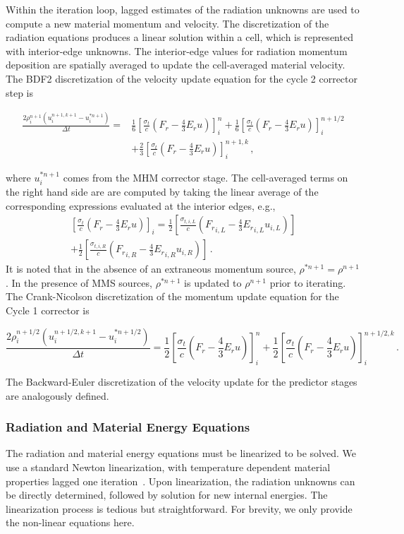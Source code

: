 \documentclass[preprint,12pt]{elsarticle}
\newcommand{\pec}{\, ,}
\newcommand{\pep}{\, .}
\newcommand{\lequ}[1]{\label{eq:#1}}
\newcommand{\half}{\frac{1}{2}}
\newcommand{\sixth}{\frac{1}{6}}
\newcommand{\E}{{E_r}}
\newcommand{\F}{{F_r}}
\newcommand{\dt}{\Delta t}
\newcommand{\iL}{_{i,L}}
\newcommand{\iR}{_{i,R}}
\newcommand{\momentumSource}{
   \left[\frac{\sigma_{t}}{c}\left(\F-\frac{4}{3}\E u\right)\right]
}
\newcommand{\momentumUpdateCN}[5]{
\begin{equation}
    \frac{#2\rho^{#4}#3\left(u^{#4,k+1}#3-u^{*#4}#3\right)}{\dt} = 
   \half\momentumSource^{#1}#3
   +\half\momentumSource^{#4,k}#3
  \pep
#5
\end{equation}
}
\newcommand{\momentumUpdateBDFTwo}[6]{
\begin{equation}\begin{split}
    \frac{#3\rho^{#5}#4\left(u^{#5,k+1}#4-u^{*#5}#4\right)}{\dt} =  
  & \sixth\momentumSource^{#1}#4
   +\sixth\momentumSource^{#2}#4\\
   &+\frac{2}{3}\momentumSource^{#5,k}#4
  \pec
#6
\end{split}\end{equation}
}
\begin{document}
Within the iteration loop, lagged estimates of the radiation unknowns are used to compute a new
material momentum and velocity.  The discretization of the radiation equations produces a linear
solution within a cell, which is represented with interior-edge unknowns.  The interior-edge values for radiation momentum deposition are spatially averaged to update the cell-averaged material
velocity.  
The BDF2 discretization of the velocity update equation for the cycle 2 corrector
step is
\momentumUpdateBDFTwo{n}{n+1/2}{2}{_i}{n+1}{\lequ{hydromBDF2full}}
where $u_i^{*n+1}$ comes from the MHM corrector stage.  The cell-averaged terms on the right hand side are are computed by taking the linear
average of the corresponding expressions evaluated at the interior edges, e.g., 
\begin{multline}
   \left[\frac{\sigma_t}{c}\left(\F - \frac{4}{3}\E u\right)\right]_i =
   \half\left[\frac{\sigma_{t,i,L}}{c}\left(\F\iL - \frac{4}{3}\E\iL u\iL\right)\right]\\
   + \half\left[\frac{\sigma_{t,i,R}}{c}\left(\F\iR - \frac{4}{3}\E\iR u\iR\right)\right]
   \pep
\end{multline}
It is noted that in the absence of an extraneous momentum source, $\rho^{*n+1}=\rho^{n+1}$. In the
presence of MMS sources, $\rho^{*n+1}$ is updated to $\rho^{n+1}$ prior to iterating.
The Crank-Nicolson discretization of the momentum update equation for the Cycle 1
corrector is
\momentumUpdateCN{n}{2}{_i}{n+1/2}{\lequ{hydromCNfull}}
The Backward-Euler discretization of the velocity update for the predictor stages are analogously defined.

\subsubsection{Radiation and Material Energy Equations}

The radiation and material energy equations must be linearized to be solved.  We use
a standard Newton linearization, with temperature dependent material properties lagged one
iteration~\cite{morelldsn}.  Upon linearization, the radiation unknowns can be directly
determined, followed by solution for new internal energies.  The linearization process is
tedious but straightforward.  For brevity, we only provide the non-linear equations here.
\end{document}
